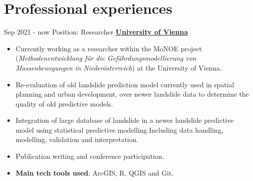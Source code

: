 \documentclass[letterpaper]{twentysecondcv} %
\begin{document}
\makeprofile %
 

\section{Professional experiences}

\begin{twenty} %
\twentyitem
    	{Sep 2021 -}
		{now}
        {Position: Researcher \color{black}} 
        {\href{https://geographie.univie.ac.at/arbeitsgruppen/engage-geomorphologische-systeme-und-risikoforschung/}{\normalsize  \textbf{\underline{\textcolor{mainblue}{University of Vienna}}}}}
        {}
        {\begin{itemize}
        \item Currently working as a researcher within the MoNOE project (\textit{Methodenentwicklung für die Gefährdungsmodellierung von Massenbewegungen in Niederösterreich}) at the University of Vienna.
        \item Re-evaluation of old landslide prediction model currently used in spatial planning and urban development, over newer landslide data to determine the quality of old predictive models.
        \item Integration of large database of landslide in a newer landslide predictive model using statistical predictive modelling.Including data handling, modelling, validation and interpretation. 
        \item Publication writing and conference participation. 
        \item \textbf{Main tech tools used}: ArcGIS, R, QGIS and Git. 
        \end{itemize}}
        \\


\end{twenty}
\end{document}
